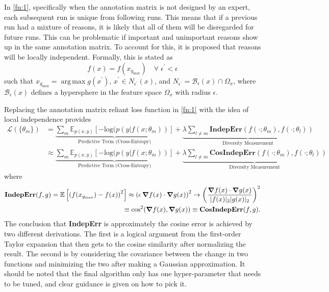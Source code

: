 \documentclass[twoside,11pt]{article}
\DeclareMathOperator*{\argmax}{arg\,max}
\begin{document}
In \cref{fn:1}, specifically when the annotation matrix is not designed by an expert, each subsequent run is unique from following runs. This means that if a previous run had a mixture of reasons, it is likely that all of them will be disregarded for future runs. This can be problematic if important and unimportant reasons show up in the same annotation matrix. To account for this, it is proposed that reasons will be locally independent. Formally, this is stated as 
\[f(x) = f(x_{g_\text{max}}) \quad \forall \; \epsilon^\prime < \epsilon\]
such that $x_{g_\text{max}} = \argmax g(x^\prime)$, $x^\prime \in N_{\epsilon^\prime}(x)$, and $N_{\epsilon^\prime} = \mathcal{B}_\epsilon(x) \cap \Omega_x$, where $\mathcal{B}_\epsilon(x)$ defines a hypersphere in the feature space $\Omega_x$ with radius $\epsilon$. 

Replacing the annotation matrix reliant loss function in \cref{fn:1} with the idea of local independence provides 
\begin{align}
\mathcal{L}(\{ \theta_m \}) & = \underbrace{\sum_m \mathbb{E}_{p(x,y)} \left[ - \text{log}(p(y|f(x; \theta_m))\right]}_\text{Predictive Term (Cross-Entropy)} + \underbrace{\lambda\sum_{l\neq m}\textbf{IndepErr}\left(f(\cdot ;\theta_m), f(\cdot ; \theta_l)\right)}_\text{Diversity Measurement} \label{fn:2}\\
&\approx \underbrace{\sum_m \mathbb{E}_{p(x,y)} \left[ - \text{log}(p(y|f(x; \theta_m))\right]}_\text{Predictive Term (Cross-Entropy)} + \underbrace{\lambda\sum_{l\neq m}\textbf{CosIndepErr}\left(f(\cdot ;\theta_m), f(\cdot ; \theta_l)\right)}_\text{Diversity Measurement} \label{fn:3}
\end{align}
where
\begin{align*}
\textbf{IndepErr}(f,g) = \mathbb{E}\left[\left(f(x_{g_\text{max}}) - f(x)\right)^2\right] \approx \left(\epsilon \, \grad{f(x)} \cdot \grad{g(x)}\right)^2 \rightarrow \left(\frac{\grad{f(x)} \cdot \grad{g(x)}}{|f(x)|_2 |g(x)|_2}\right)^2 \\
\equiv \cos[2](\grad{f(x)}, \grad{g(x)}) \equiv \textbf{CosIndepErr}(f,g).
\end{align*}
The conclusion that \textbf{IndepErr} is approximately the cosine error is achieved by two different derivations. The first is a logical argument from the first-order Taylor expansion that then gets to the cosine similarity after normalizing the result. The second is by considering the covariance between the change in two functions and minimizing the two after making a Gaussian approximation. It should be noted that the final algorithm only has one hyper-parameter that needs to be tuned, and clear guidance is given on how to pick it.
\end{document}
